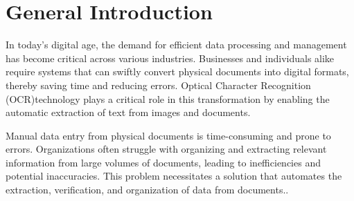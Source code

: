\chapter*{General Introduction}
In today's digital age, the demand for efficient data processing and management has become critical across various industries. Businesses and individuals alike require systems that can swiftly convert physical documents into digital formats, thereby saving time and reducing errors. Optical Character Recognition (OCR)technology plays a critical role in this transformation by enabling the automatic extraction of text from images and documents.

Manual data entry from physical documents is time-consuming and prone to errors. Organizations often struggle with organizing and extracting relevant information from large volumes of documents, leading to inefficiencies and potential inaccuracies. This problem necessitates a solution that automates the extraction, verification, and organization of data from documents..\\

\vspace{1mm}

